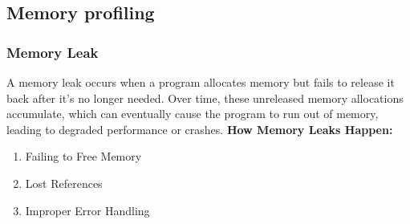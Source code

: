 \documentclass{article}
\begin{document}
\subsection{Memory profiling}
\subsubsection{Memory Leak}
A memory leak occurs when a program allocates memory but fails to release it back after it’s no longer needed. Over time, these unreleased memory allocations accumulate, which can eventually cause the program to run out of memory, leading to degraded performance or crashes.\newline
\textbf{How Memory Leaks Happen:}
\begin{enumerate}
    \item Failing to Free Memory
    \item Lost References
    \item Improper Error Handling
\end{enumerate}
\newpage
\end{document}
